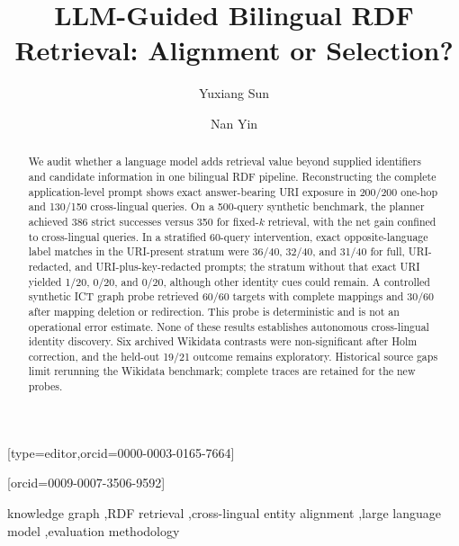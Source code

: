 \documentclass[a4paper,fleqn]{cas-dc}
\begin{document}
\let\WriteBookmarks\relax
\def\floatpagepagefraction{1}
\def\textpagefraction{.001}
\title[mode = title]{LLM-Guided Bilingual RDF Retrieval: Alignment or Selection?}

\author[1]{Yuxiang Sun}[type=editor,orcid=0000-0003-0165-7664]
\author[2]{Nan Yin}[orcid=0009-0007-3506-9592]

\begin{abstract}
We audit whether a language model adds retrieval value beyond supplied identifiers and candidate information in one bilingual RDF pipeline. Reconstructing the complete application-level prompt shows exact answer-bearing URI exposure in 200/200 one-hop and 130/150 cross-lingual queries. On a 500-query synthetic benchmark, the planner achieved 386 strict successes versus 350 for fixed-$k$ retrieval, with the net gain confined to cross-lingual queries. In a stratified 60-query intervention, exact opposite-language label matches in the URI-present stratum were 36/40, 32/40, and 31/40 for full, URI-redacted, and URI-plus-key-redacted prompts; the stratum without that exact URI yielded 1/20, 0/20, and 0/20, although other identity cues could remain. A controlled synthetic ICT graph probe retrieved 60/60 targets with complete mappings and 30/60 after mapping deletion or redirection. This probe is deterministic and is not an operational error estimate. None of these results establishes autonomous cross-lingual identity discovery. Six archived Wikidata contrasts were non-significant after Holm correction, and the held-out 19/21 outcome remains exploratory. Historical source gaps limit rerunning the Wikidata benchmark; complete traces are retained for the new probes.\end{abstract}

\begin{keywords}
knowledge graph \sep RDF retrieval \sep cross-lingual entity alignment \sep large language model \sep evaluation methodology
\end{keywords}
\maketitle
{}
\end{document}
